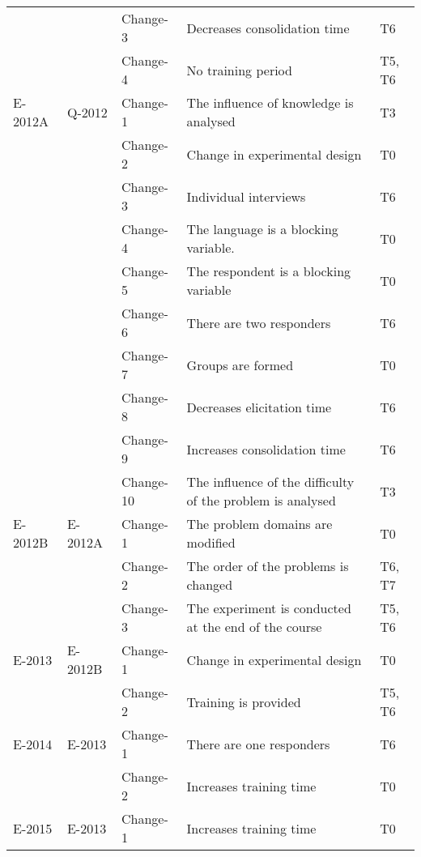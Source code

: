 \begin{table}
\begin{minipage}{6cm}
\begin{tabular}{| l | l | l |p{6.5cm} |  l |}
~ & ~ & Change-3 & Decreases consolidation time  & T6 \\
~ & ~ & Change-4 & No training period  & T5, T6 \\ \hline
E-2012A & Q-2012 & Change-1 & The influence of knowledge is analysed  & T3 \\
~ & ~ & Change-2 &  Change in experimental design  & T0 \\
~ & ~ & Change-3 &  Individual interviews  & T6 \\
~ & ~ & Change-4 &  The language is a blocking variable.  & T0 \\
~ & ~ & Change-5 &  The respondent is a blocking variable  & T0 \\
~ & ~ & Change-6 &  There are two responders  & T6 \\%
~ & ~ & Change-7 &  Groups are formed  & T0 \\ 
~ & ~ & Change-8 &  Decreases elicitation time  & T6 \\
~ & ~ & Change-9 &  Increases consolidation time  & T6 \\
~ & ~ & Change-10 &  The influence of the difficulty of the problem is analysed  & T3 \\ \hline
E-2012B & E-2012A & Change-1 & The problem domains are modified & T0 \\
~ & ~ & Change-2 &  The order of the problems is changed  & T6, T7 \\
~ & ~ & Change-3 &  The experiment is conducted at the end of the course  & T5, T6 \\ \hline
E-2013 & E-2012B & Change-1 & Change in experimental design  & T0 \\
~ & ~ & Change-2 &  Training is provided  & T5, T6 \\ \hline
E-2014 & E-2013 & Change-1 & There are one responders  & T6 \\
~ & ~ & Change-2 &  Increases training time  & T0 \\ \hline
E-2015 & E-2013 & Change-1 & Increases training time  & T0 \\ \hline \hline


\end{tabular}
\end{minipage}
\end{table}
